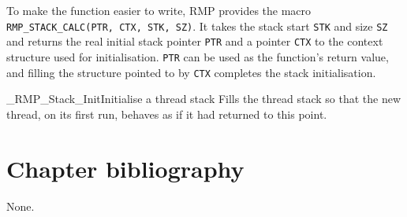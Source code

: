 To make the function easier to write, RMP provides the macro \texttt{RMP\_STACK\_CALC(PTR, CTX, STK, SZ)}.
It takes the stack start \texttt{STK} and size \texttt{SZ} and returns the real initial stack pointer \texttt{PTR} and a pointer \texttt{CTX} to the context structure used for initialisation.
\texttt{PTR} can be used as the function's return value, and
filling the structure pointed to by \texttt{CTX} completes the stack
initialisation.

\begin{apidesc}{\_RMP\_Stack\_Init}{Initialise a thread stack}\label{port:Stack_Init}
    Fills the thread stack so that the new thread, on its first run, behaves as if it had returned to this point.
    \begin{apiparams}
    \end{apiparams}
    \begin{apiret}
    \end{apiret}
\end{apidesc}

\section{Chapter bibliography}

None.
